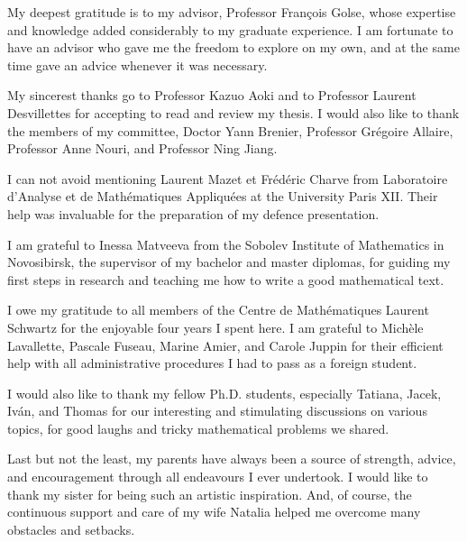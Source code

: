 My deepest gratitude is to my advisor, Professor François Golse, whose expertise and knowledge added considerably to my graduate experience. I am fortunate to have an advisor who gave me the freedom to explore on my own, and at the same time gave an advice whenever it was necessary.

My sincerest thanks go to Professor Kazuo Aoki and to Professor Laurent Desvillettes for accepting to read and review my thesis. I would also like to thank the members of my committee, Doctor Yann Brenier, Professor Grégoire Allaire, Professor Anne Nouri, and Professor Ning Jiang. 

I can not avoid mentioning Laurent Mazet et Frédéric Charve from  Laboratoire d'Analyse et de Mathématiques Appliquées at the University Paris XII. Their help was invaluable for the preparation of my defence presentation.

I am grateful to Inessa Matveeva from the Sobolev Institute of Mathematics in Novosibirsk, the supervisor of my bachelor and master diplomas, for guiding  my first steps in research and teaching me how to write a good mathematical text.

I owe my gratitude to all members of the Centre de Mathématiques Laurent Schwartz for the enjoyable four years I spent here. I am grateful to Michèle Lavallette, Pascale Fuseau, Marine Amier, and Carole Juppin for their efficient help with all administrative procedures I had to pass as a foreign student.

I would also like to thank my fellow Ph.D. students, especially Tatiana, Jacek, Iván, and Thomas for our interesting and stimulating discussions on various topics, for good laughs and tricky mathematical problems we shared.

Last but not the least, my parents have always been a source of strength, advice, and encouragement through all endeavours I ever undertook. I would like to thank my sister for being such an artistic inspiration. And, of course, the continuous support and care of my wife Natalia helped me overcome many obstacles and setbacks.
